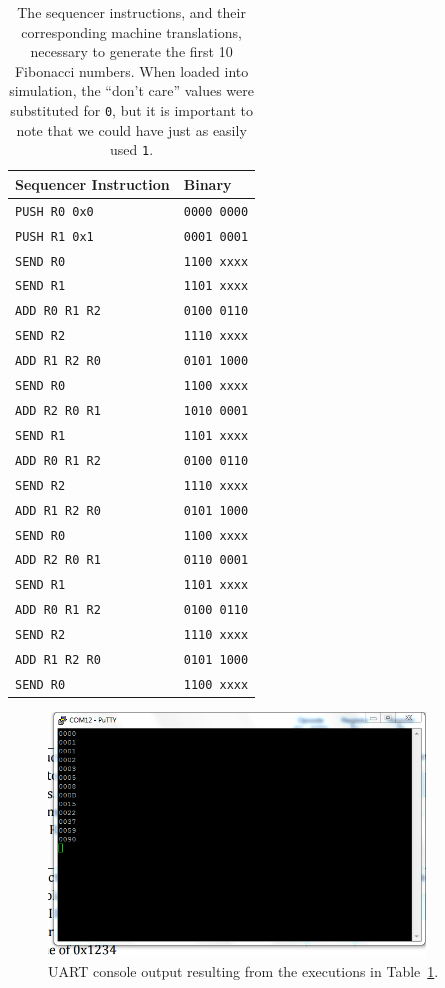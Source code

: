 \documentclass[]{article}
\begin{document}
\begin{table}[H]
\centering
\begin{tabular}{ l | l }
\textbf{Sequencer Instruction} & \textbf{Binary}\\\hline
\texttt{PUSH R0 0x0} & \texttt{0000 0000}\\
\texttt{PUSH R1 0x1} & \texttt{0001 0001}\\
\texttt{SEND R0} & \texttt{1100 xxxx}\\
\texttt{SEND R1} & \texttt{1101 xxxx}\\
\texttt{ADD R0 R1 R2} & \texttt{0100 0110}\\
\texttt{SEND R2} & \texttt{1110 xxxx}\\
\texttt{ADD R1 R2 R0} & \texttt{0101 1000}\\
\texttt{SEND R0} & \texttt{1100 xxxx}\\
\texttt{ADD R2 R0 R1} & \texttt{1010 0001}\\
\texttt{SEND R1} & \texttt{1101 xxxx}\\
\texttt{ADD R0 R1 R2} & \texttt{0100 0110}\\
\texttt{SEND R2} & \texttt{1110 xxxx}\\
\texttt{ADD R1 R2 R0} & \texttt{0101 1000}\\
\texttt{SEND R0} & \texttt{1100 xxxx}\\
\texttt{ADD R2 R0 R1} & \texttt{0110 0001}\\
\texttt{SEND R1} & \texttt{1101 xxxx}\\
\texttt{ADD R0 R1 R2} & \texttt{0100 0110}\\
\texttt{SEND R2} & \texttt{1110 xxxx}\\
\texttt{ADD R1 R2 R0} & \texttt{0101 1000}\\
\texttt{SEND R0} & \texttt{1100 xxxx}\\
\end{tabular}
\caption{The sequencer instructions, and their corresponding machine translations, necessary to generate the first 10 Fibonacci numbers. When loaded into simulation, the ``don't care'' values were substituted for \texttt{0}, but it is important to note that we could have just as easily used \texttt{1}.}
\label{table:fib}
\end{table}

\begin{figure}[H]
\centering
\includegraphics[width=10cm]{fib.PNG}
\caption{UART console output resulting from the executions in Table~\ref{table:fib}.}
\end{figure}
\end{document}
